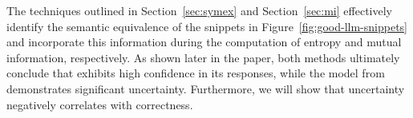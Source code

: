 
The techniques outlined in Section~\ref{sec:symex} and Section~\ref{sec:mi} effectively identify the semantic equivalence of the snippets in Figure~\ref{fig:good-llm-snippets} and incorporate this information during the computation of entropy and mutual information, respectively. 
As shown later in the paper, both methods ultimately conclude that \gptturbo exhibits high confidence in its responses, while the model from \salesforce demonstrates significant uncertainty. 
Furthermore, we will show that uncertainty negatively correlates with correctness.
